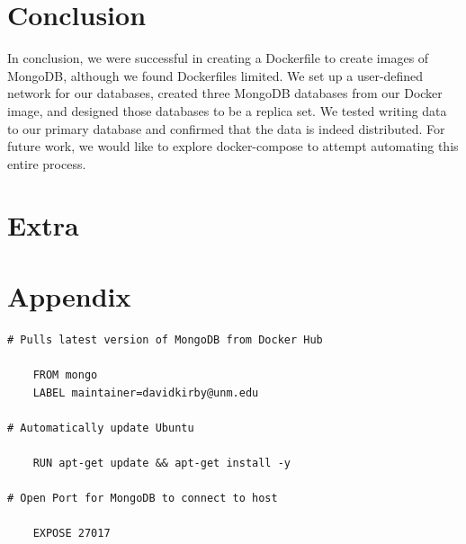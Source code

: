 \documentclass{article}
\begin{document}
\section{Conclusion}
In conclusion, we were successful in creating a Dockerfile to create images of MongoDB, although we found Dockerfiles limited. We set up a  user-defined network for our databases, created three MongoDB databases from our Docker image, and designed those databases to be a replica set. We tested writing data to our primary database and confirmed that the data is indeed distributed. For future work, we would like to explore docker-compose to attempt automating this entire process.

\section{Extra}











\section{Appendix}\label{sec:Appendix}

\begin{tcolorbox}[colback=CrispBlue!5!white,colframe=CrispBlue!75!black,title=Dockerfile]
\begin{verbatim}
# Pulls latest version of MongoDB from Docker Hub

    FROM mongo
    LABEL maintainer=davidkirby@unm.edu

# Automatically update Ubuntu

    RUN apt-get update && apt-get install -y

# Open Port for MongoDB to connect to host

    EXPOSE 27017
\end{verbatim}
\end{tcolorbox}
\end{document}
